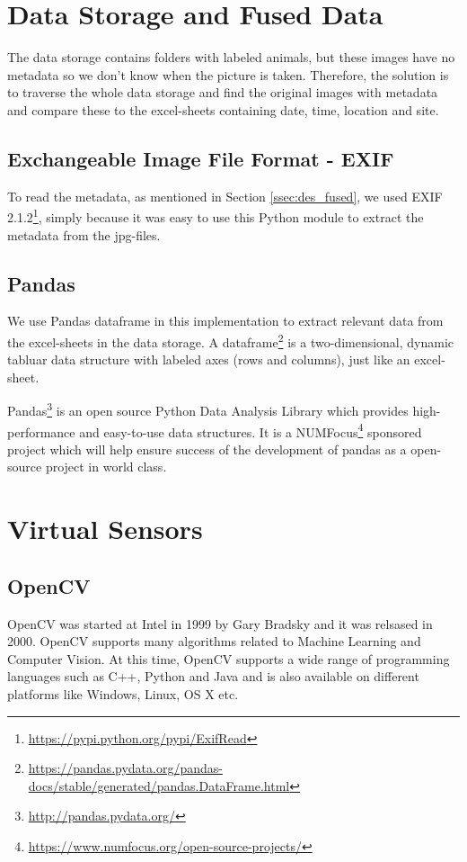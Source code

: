 \documentclass[USenglish]{uit-thesis}
\begin{document}

\section{Data Storage and Fused Data} \label{ssec:storage_fused}
The data storage contains folders with labeled animals, but these images have no metadata so we don't know when the picture is taken. Therefore, the solution is to traverse the whole data storage and find the original images with metadata and compare these to the excel-sheets containing date, time, location and site.

\subsection{Exchangeable Image File Format - EXIF}
To read the metadata, as mentioned in Section \ref{ssec:des_fused}, we used EXIF 2.1.2\footnote{\url{https://pypi.python.org/pypi/ExifRead}}, simply because it was easy to use this Python module to extract the metadata from the jpg-files.

\subsection{Pandas}
We use Pandas dataframe in this implementation to extract relevant data from the excel-sheets in the data storage. A dataframe\footnote{\url{https://pandas.pydata.org/pandas-docs/stable/generated/pandas.DataFrame.html}} is a two-dimensional, dynamic tabluar data structure with labeled axes (rows and columns), just like an excel-sheet.

Pandas\footnote{\url{http://pandas.pydata.org/}} is an open source Python Data Analysis Library which provides high-performance and easy-to-use data structures. It is a NUMFocus\footnote{\url{https://www.numfocus.org/open-source-projects/}} sponsored project which will help ensure success of the development of pandas as a open-source project in world class. 


\section{Virtual Sensors} \label{vsensor}

\subsection{OpenCV}
OpenCV was started at Intel in 1999 by Gary Bradsky and it was relsased in 2000. OpenCV supports many algorithms related to Machine Learning and Computer Vision. 
At this time, OpenCV supports a wide range of programming languages such as C++, Python and Java and is also available on different platforms like Windows, Linux, OS X etc.
\end{document}
